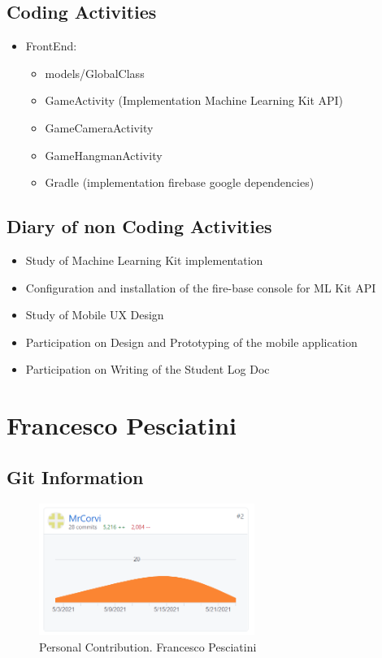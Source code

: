 \documentclass{article}
\begin{document}
\subsection{Coding Activities}

\begin{itemize}
\item FrontEnd:
    \begin{itemize}
    \item models/GlobalClass
    \item GameActivity (Implementation Machine Learning Kit API)
    \item GameCameraActivity
    \item GameHangmanActivity
    \item Gradle (implementation firebase google dependencies)
    \end{itemize}
\end{itemize}

\subsection{Diary of non Coding Activities}
\begin{itemize}
    \item Study of Machine Learning Kit implementation
    \item Configuration and installation of the fire-base console for ML Kit API 
    \item Study of Mobile UX Design
    \item Participation on Design and Prototyping of the mobile application
    \item Participation on Writing of the Student Log Doc
\end{itemize}


\section{Francesco Pesciatini}

\subsection{Git Information}

\begin{figure}[h!]
\centering
\includegraphics[width=7cm]{img/fp.PNG}
\caption{Personal Contribution. Francesco Pesciatini}
\end{figure}
\end{document}
